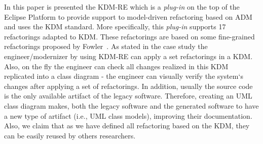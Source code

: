 In this paper is presented the KDM-RE which is a \textit{plug-in} on the top of the Eclipse Platform to provide support to model-driven refactoring based on ADM and uses the KDM standard. More specifically, this \textit{plug-in} supports 17 refactorings adapted to KDM. These refactorings are based on some fine-grained refactorings proposed by Fowler~\cite{refactImpro}. As stated in the case study the engineer/modernizer by using KDM-RE can apply a set refactorings in a KDM. Also, on the fly the engineer can check all changes realized in this KDM replicated into a class diagram - the engineer can visually verify the system`s changes after applying a set of refactorings. In addition, usually the source code is the only available artifact of the legacy software. 
Therefore, creating an UML class diagram makes, both the legacy software and the generated software to have a new type of artifact (i.e., UML class models), improving their documentation. %
Also, we claim that as we have defined all refactoring based on the KDM, they can be easily reused by others researchers. 



